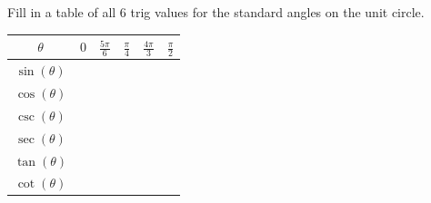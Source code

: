 \newpage

\begin{myPractice}
	Fill in a table of all 6 trig values for the standard angles on the unit circle.
	\begin{center}
		\renewcommand{\arraystretch}{2} 
		\begin{tabular}{|| c | P{1.5cm} | P{1.5cm} | P{1.5cm} | P{1.5cm} | P{1.5cm} ||}
			\hline
			$\theta$ & $0$ & $\frac{5\pi}{6}$ & $\frac{\pi}{4}$ & $\frac{4\pi}{3}$ & $\frac{\pi}{2}$ \\
			\hline
			$\sin(\theta)$ & & & & &\\ 
			\hline
			$\cos(\theta)$ & & & & &\\ 
			\hline
			$\csc(\theta)$ & & & & &\\ 
			\hline
			$\sec(\theta)$ & & & & &\\ 
			\hline
			$\tan(\theta)$ & & & & &\\ 
			\hline
			$\cot(\theta)$ & & & & &\\ 
			\hline
		\end{tabular}
	\end{center}
\end{myPractice}


